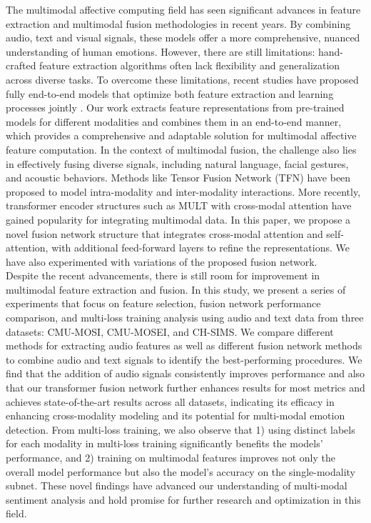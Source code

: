 \documentclass[11pt]{article}
\begin{document}
The multimodal affective computing field has seen significant advances in feature extraction and multimodal fusion methodologies in recent years. By combining audio,  text and visual signals, these models offer a more comprehensive, nuanced understanding of human emotions. However, there are still limitations: hand-crafted feature extraction algorithms often lack flexibility and generalization across diverse tasks. To overcome these limitations, recent studies have proposed fully end-to-end models that optimize both feature extraction and learning processes jointly \cite{dai-etal-2021-multimodal}. Our work extracts feature representations from pre-trained models for different modalities and combines them in an end-to-end manner, which provides a comprehensive and adaptable solution for multimodal affective feature computation.  In the context of multimodal fusion, the challenge also lies in effectively fusing diverse signals, including natural language, facial gestures, and acoustic behaviors. Methods like Tensor Fusion Network (TFN)\cite{zadeh2017tensor} have been proposed to model intra-modality and inter-modality interactions. More recently, transformer encoder structures such as MULT\cite{tsai2019multimodal} with cross-modal attention have gained popularity for integrating multimodal data. In this paper, we propose a novel fusion network structure that integrates cross-modal attention and self-attention, with additional feed-forward layers to refine the representations. We have also experimented with variations of the proposed fusion network.\\
Despite the recent advancements, there is still room for improvement in multimodal feature extraction and fusion. In this study, we present a series of experiments that focus on feature selection, fusion network performance comparison, and multi-loss training analysis using audio and text data from three datasets:  CMU-MOSI, CMU-MOSEI, and CH-SIMS. We compare different methods for extracting audio features as well as different fusion network methods to combine audio and text signals to identify the best-performing procedures. We find that the addition of audio signals consistently improves performance and also that our transformer fusion network further enhances results for most metrics and achieves state-of-the-art results across all datasets, indicating its efficacy in enhancing cross-modality modeling and its potential for multi-modal emotion detection. From multi-loss training, we also observe that 1) using distinct labels for each modality in multi-loss training significantly benefits the models' performance, and 2) training on multimodal features improves not only the overall model performance but also the model's accuracy on the single-modality subnet. These novel findings have advanced our understanding of multi-modal sentiment analysis and hold promise for further research and optimization in this field.
\end{document}

